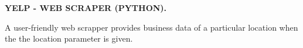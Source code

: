 \begin{cventries}

  \cvproject
     {\textbf{YELP - WEB SCRAPER (PYTHON).}} %
    {}
    {}
    {}
    {
      \begin{cvitems} %
        \item {A user-friendly web scrapper provides business data of a particular location when the the location parameter is given.}
      \end{cvitems}
    }

\end{cventries}
